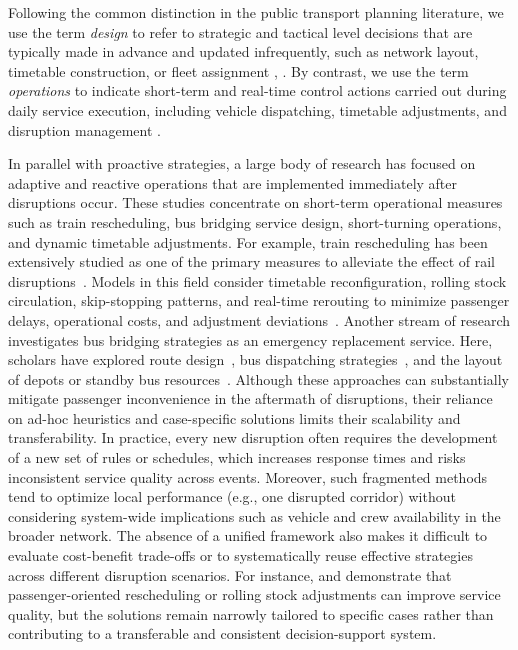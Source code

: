 \documentclass[3p,times,procedia]{elsarticle}
\begin{document}
Following the common distinction in the public transport planning literature, we use the term \textit{design} to refer to strategic and tactical level decisions that are typically made in advance and updated infrequently, such as network layout, timetable construction, or fleet assignment \citep{Desaulnier2007}, \citep[Section~1.5.2]{Cascetta2009}. By contrast, we use the term \textit{operations} to indicate short-term and real-time control actions carried out during daily service execution, including vehicle dispatching, timetable adjustments, and disruption management \citep[Ch.~13]{Gkiotsalitis2022}.

In parallel with proactive strategies, a large body of research has focused on adaptive and reactive operations 
that are implemented immediately after disruptions occur. 
These studies concentrate on short-term operational measures such as train rescheduling, bus bridging service design, 
short-turning operations, and dynamic timetable adjustments. 
For example, train rescheduling has been extensively studied as one of the primary measures to alleviate the effect of rail disruptions~\citep{Cacchiani2014,Xu2017,Veelenturf2016,ZhuGoverde2020}. 
Models in this field consider timetable reconfiguration, rolling stock circulation, skip-stopping patterns, and real-time rerouting 
to minimize passenger delays, operational costs, and adjustment deviations~\citep{Kang2015,Corman2012}. 
Another stream of research investigates bus bridging strategies as an emergency replacement service. 
Here, scholars have explored route design~\citep{Jin2016,vanDerHurk2016,Deng2018}, 
bus dispatching strategies~\citep{Wang2014,Yuan2025}, and the layout of depots or standby bus resources~\citep{Pender2014,Pender2015}. 
Although these approaches can substantially mitigate passenger inconvenience in the aftermath of disruptions, their reliance on ad-hoc heuristics and case-specific solutions limits their scalability and transferability. 
In practice, every new disruption often requires the development of a new set of rules or schedules, which increases response times and risks inconsistent service quality across events. 
Moreover, such fragmented methods tend to optimize local performance (e.g., one disrupted corridor) without considering system-wide implications such as vehicle and crew availability in the broader network. 
The absence of a unified framework also makes it difficult to evaluate cost-benefit trade-offs or to systematically reuse effective strategies across different disruption scenarios. 
For instance, \citet{binder2017multi} and \citet{van2018passenger} 
demonstrate that passenger-oriented rescheduling or rolling stock adjustments can improve service quality, but the solutions remain narrowly tailored to specific cases rather than contributing to a transferable and consistent decision-support system.
\end{document}
